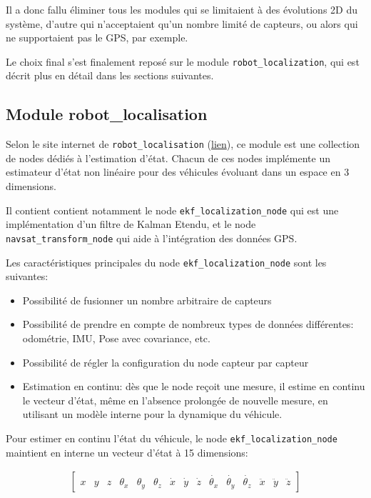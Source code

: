 \documentclass[12pt,a4paper]{report}
\begin{document}
	\para Il a donc fallu éliminer tous les modules qui se limitaient à des évolutions 2D du système, d'autre qui n'acceptaient qu'un nombre limité de capteurs, ou alors qui ne supportaient pas le GPS, par exemple.
	
	\para Le choix final s'est finalement reposé sur le module \verb|robot_localization|, qui est décrit plus en détail dans les sections suivantes.
	
	\subsection{Module robot\_localisation}
	Selon le site internet de \verb|robot_localisation| (\href{http://docs.ros.org/melodic/api/robot_localization/html/index.html}{lien}), ce module est une collection de nodes dédiés à l'estimation d'état. Chacun de ces nodes implémente un estimateur d'état non linéaire pour des véhicules évoluant dans un espace en 3 dimensions.
	
	\para Il contient contient notamment le node \verb|ekf_localization_node| qui est une implémentation d'un filtre de Kalman Etendu, et le node \verb|navsat_transform_node| qui aide à l'intégration des données GPS.
	
	\para Les caractéristiques principales du node \verb|ekf_localization_node| sont les suivantes:
	\begin{itemize}
		\item Possibilité de fusionner un nombre arbitraire de capteurs
		\item Possibilité de prendre en compte de nombreux types de données différentes: odométrie, IMU, Pose avec covariance, etc.
		\item Possibilité de régler la configuration du node capteur par capteur
		\item Estimation en continu: dès que le node reçoit une mesure, il estime en continu le vecteur d'état, même en l'absence prolongée de nouvelle mesure, en utilisant un modèle interne pour la dynamique du véhicule.
	\end{itemize}

	\para Pour estimer en continu l'état du véhicule, le node \verb|ekf_localization_node| maintient en interne un vecteur d'état à 15 dimensions:
	
	\begin{gather}
		\begin{bmatrix}
			x&y&z&\theta_x&\theta_y&\theta_z&
			\dot{x}&\dot{y}&\dot{z}&\dot{\theta_x}&\dot{\theta_y}&\dot{\theta_z} &\ddot{x}&\ddot{y}&\ddot{z}
		\end{bmatrix}
	\end{gather}
	
\end{document}
